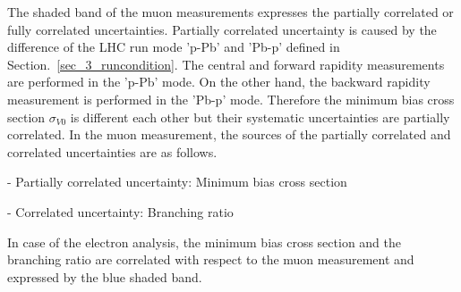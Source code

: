 The shaded band of the muon measurements expresses the partially correlated or fully correlated uncertainties.
Partially correlated uncertainty is caused by the difference of the LHC run mode 'p-Pb' and 'Pb-p' defined in Section.~\ref{sec_3_runcondition}.
The central and forward rapidity measurements are performed in the 'p-Pb' mode. 
On the other hand, the backward rapidity measurement is performed in the 'Pb-p' mode. 
Therefore the minimum bias cross section $\sigma_{V0}$ is different each other but their systematic uncertainties are partially correlated. 
In the muon measurement, the sources of the partially correlated and correlated uncertainties are as follows. 
\begin{description}
	\item{- Partially correlated uncertainty:}  Minimum bias cross section
	\item{- Correlated uncertainty:}  Branching ratio
\end{description}
In case of the electron analysis, the minimum bias cross section and the branching ratio are correlated with respect to the muon measurement and expressed by the blue shaded band. 

